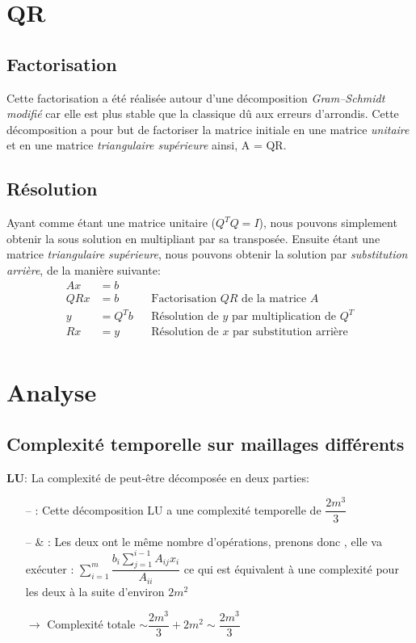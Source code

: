 \documentclass{article}[11pt]
\begin{document}
\section{QR}
\subsection{Factorisation}
Cette factorisation a été réalisée autour d'une décomposition \textit{Gram–Schmidt modifié} car elle est plus stable que la classique dû aux erreurs d'arrondis.
Cette décomposition a pour but de factoriser la matrice initiale  en une matrice  \textit{unitaire} et en une matrice  \textit{triangulaire supérieure} ainsi, {A = QR}.

\subsection{Résolution}
Ayant  comme étant une matrice unitaire ($Q^{T}Q=I$), nous pouvons simplement obtenir la sous solution en multipliant par sa transposée. Ensuite  étant une matrice \textit{triangulaire supérieure}, nous pouvons obtenir la solution par \textit{substitution arrière}, de la manière suivante:
\begin{align*}
    Ax&=b \\
    QRx&=b && \text{Factorisation } QR \text{ de la matrice } A\\
    y&=Q^Tb && \text{Résolution de } y \text{ par multiplication de } Q^T\\
    Rx&=y && \text{Résolution de } x \text{ par substitution arrière}\\
\end{align*}
\section{Analyse}
\subsection{Complexité temporelle sur maillages différents}
\textbf{LU}: La complexité de  peut-être décomposée en deux parties:
\begin{itemize}
    \item[--] : Cette décomposition LU a une complexité temporelle de $\dfrac{2m^3}{3}$
    \item[--]  \& : Les deux ont le même nombre d'opérations, prenons donc , elle va exécuter : $\sum_{i=1}^{m}\dfrac{b_i\sum_{j=1}^{i-1}A_{ij}x_{i}}{A_{ii}}$ ce qui est équivalent à une complexité pour les deux à la suite d'environ $2m^2$
    \item[] $\rightarrow$ Complexité totale $\sim \dfrac{2m^3}{3} + 2m^2 \sim \dfrac{2m^3}{3}$
\end{itemize}
\end{document}
